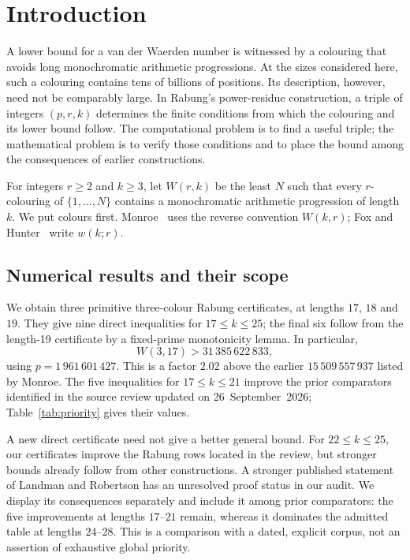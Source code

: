 \section{Introduction}\label{s:intro}

A lower bound for a van der Waerden number is witnessed by a colouring that
avoids long monochromatic arithmetic progressions. At the sizes considered
here, such a colouring contains tens of billions of positions. Its description,
however, need not be comparably large. In Rabung's power-residue construction,
a triple of integers $(p,r,k)$ determines the finite conditions from which the
colouring and its lower bound follow. The computational problem is to find a
useful triple; the mathematical problem is to verify those conditions and to
place the bound among the consequences of earlier constructions.

For integers $r\ge2$ and $k\ge3$, let $W(r,k)$ be the least $N$ such that
every $r$-colouring of $\{1,\dots,N\}$ contains a monochromatic arithmetic
progression of length $k$. We put colours first. Monroe~\cite{Monroe2026}
uses the reverse convention $W(k,r)$; Fox and Hunter~\cite{FoxHunter2026}
write $w(k;r)$.

\subsection{Numerical results and their scope}

We obtain three primitive three-colour Rabung certificates, at lengths
$17$, $18$ and $19$. They give nine direct inequalities for $17\le k\le25$;
the final six follow from the length-19 certificate by a fixed-prime
monotonicity lemma. In particular,
\[
 W(3,17)>31\,385\,622\,833,
\]
using $p=1\,961\,601\,427$. This is a factor $2.02$ above the earlier
$15\,509\,557\,937$ listed by Monroe. The five inequalities for
$17\le k\le21$ improve the prior comparators identified in the source review
updated on 26~September~2026; Table~\ref{tab:priority} gives their values.

A new direct certificate need not give a better general bound. For
$22\le k\le25$, our certificates improve the Rabung rows located in the
review, but stronger bounds already follow from other constructions. A
stronger published statement of Landman and Robertson has an unresolved
proof status in our audit. We display its consequences separately and include
it among prior comparators: the five improvements at lengths $17$--$21$
remain, whereas it dominates the admitted table at lengths $24$--$28$.
This is a comparison with a dated, explicit corpus, not an assertion of
exhaustive global priority.

